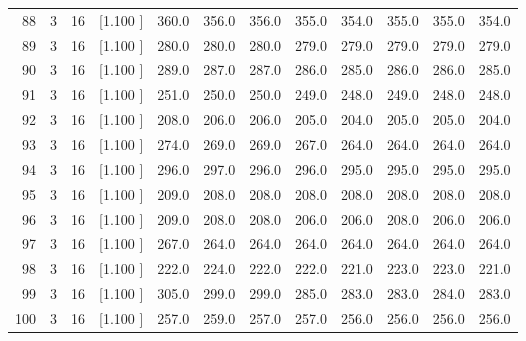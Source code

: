 \documentclass[12pt,a4paper]{article}
\begin{document}
\begin{center}
{\begin{tabular}{r r r r r r r r r r r r}
  88&  3& 16&[1.100     ]&   360.0&   356.0&   356.0&   355.0&   354.0&   355.0&   355.0&   354.0\\[-0.02in]
  89&  3& 16&[1.100     ]&   280.0&   280.0&   280.0&   279.0&   279.0&   279.0&   279.0&   279.0\\[-0.02in]
  90&  3& 16&[1.100     ]&   289.0&   287.0&   287.0&   286.0&   285.0&   286.0&   286.0&   285.0\\[-0.02in]
  91&  3& 16&[1.100     ]&   251.0&   250.0&   250.0&   249.0&   248.0&   249.0&   248.0&   248.0\\[-0.02in]
  92&  3& 16&[1.100     ]&   208.0&   206.0&   206.0&   205.0&   204.0&   205.0&   205.0&   204.0\\[-0.02in]
  93&  3& 16&[1.100     ]&   274.0&   269.0&   269.0&   267.0&   264.0&   264.0&   264.0&   264.0\\[-0.02in]
  94&  3& 16&[1.100     ]&   296.0&   297.0&   296.0&   296.0&   295.0&   295.0&   295.0&   295.0\\[-0.02in]
  95&  3& 16&[1.100     ]&   209.0&   208.0&   208.0&   208.0&   208.0&   208.0&   208.0&   208.0\\[-0.02in]
  96&  3& 16&[1.100     ]&   209.0&   208.0&   208.0&   206.0&   206.0&   208.0&   206.0&   206.0\\[-0.02in]
  97&  3& 16&[1.100     ]&   267.0&   264.0&   264.0&   264.0&   264.0&   264.0&   264.0&   264.0\\[-0.02in]
  98&  3& 16&[1.100     ]&   222.0&   224.0&   222.0&   222.0&   221.0&   223.0&   223.0&   221.0\\[-0.02in]
  99&  3& 16&[1.100     ]&   305.0&   299.0&   299.0&   285.0&   283.0&   283.0&   284.0&   283.0\\[-0.02in]
 100&  3& 16&[1.100     ]&   257.0&   259.0&   257.0&   257.0&   256.0&   256.0&   256.0&   256.0\\[-0.02in]

\hline
\end{tabular}}
\end{center}
\end{document}
